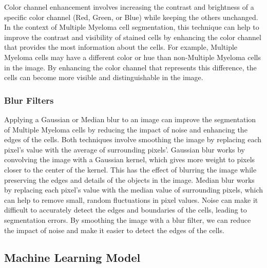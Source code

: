 \documentclass{article}
\begin{document}
Color channel enhancement involves increasing the contrast and brightness of a specific color channel (Red, Green, or Blue) while keeping the others unchanged. In the context of Multiple Myeloma cell segmentation, this technique can help to improve the contrast and visibility of stained cells by enhancing the color channel that provides the most information about the cells. For example, Multiple Myeloma cells may have a different color or hue than non-Multiple Myeloma cells in the image. By enhancing the color channel that represents this difference, the cells can become more visible and distinguishable in the image.

\subsubsection{Blur Filters}

Applying a Gaussian or Median blur to an image can improve the segmentation of Multiple Myeloma cells by reducing the impact of noise and enhancing the edges of the cells. Both techniques involve smoothing the image by replacing each pixel's value with the average of surrounding pixels'. Gaussian blur works by convolving the image with a Gaussian kernel, which gives more weight to pixels closer to the center of the kernel. This has the effect of blurring the image while preserving the edges and details of the objects in the image. Median blur works by replacing each pixel's value with the median value of surrounding pixels, which can help to remove small, random fluctuations in pixel values. Noise can make it difficult to accurately detect the edges and boundaries of the cells, leading to segmentation errors. By smoothing the image with a blur filter, we can reduce the impact of noise and make it easier to detect the edges of the cells.

\subsection{Machine Learning Model}
\end{document}
